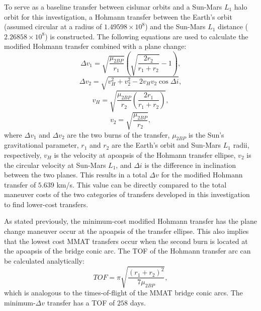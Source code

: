 To serve as a baseline transfer between cislunar orbits and a Sun-Mars $L_{1}$ halo orbit for this
investigation, a Hohmann transfer between the Earth's orbit (assumed circular at a radius of
$1.49598\times10^{8}$) and the Sun-Mars $L_{1}$ distance ($2.26858\times10^{8}$) is constructed.
The following equations are used to calculate the modified Hohmann transfer combined with a plane
change:
\begin{equation}
    \Delta v_{1}=\sqrt{\frac{\mu_{2BP}}{r_{1}}}(\sqrt{\frac{2r_{2}}{r_{1}+r_{2}}}-1),
    \label{eq:Hohmann1}
\end{equation}
\begin{equation}
    \Delta v_{2}=\sqrt{v_{H}^{2}+v_{2}^{2}-2v_{H}v_{2}\cos\Delta i},
    \label{eq:Hohmann2}
\end{equation}
\begin{equation}
    v_{H}=\sqrt{\frac{\mu_{2BP}}{r_{2}}(\frac{2r_{1}}{r_{1}+r_{2}})},
    \label{eq:transferv}
\end{equation}
\begin{equation}
    v_{2}=\sqrt{\frac{\mu_{2BP}}{r_{2}}},
    \label{eq:circlev}
\end{equation}
where $\Delta v_{1}$ and $\Delta v_{2}$ are the two burns of the transfer, $\mu_{2BP}$ is the Sun's
gravitational parameter, $r_{1}$ and $r_{2}$ are the Earth's orbit and Sun-Mars $L_{1}$ radii,
respectively, $v_{H}$ is the velocity at apoapsis of the Hohmann transfer ellipse, $v_{2}$ is the
circular velocity at Sun-Mars $L_{1}$, and $\Delta i$ is the difference in inclination between the
two planes. This results in a total $\Delta v$ for the modified Hohmann transfer of $5.639$ km/s.
This value can be directly compared to the total maneuver costs of the two categories of transfers
developed in this investigation to find lower-cost transfers.

As stated previously, the minimum-cost modified Hohmann transfer has the plane change maneuver
occur at the apoapsis of the transfer ellipse. This also implies that the lowest cost MMAT
transfers occur when the second burn is located at the apoapsis of the bridge conic arc. The TOF of
the Hohmann transfer arc can be calculated analytically:
\begin{equation}
    TOF=\pi\sqrt{\frac{(r_{1}+r_{2})^{2}}{7\mu_{2BP}}},
    \label{eq:HohmannTOF}
\end{equation}
which is analogous to the times-of-flight of the MMAT bridge conic arcs. The minimum-$\Delta v$
transfer has a TOF of $258$ days.
